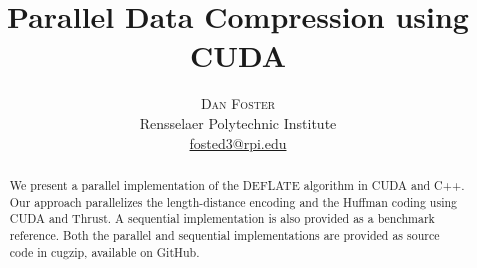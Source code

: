 \documentclass[twoside]{article}
\title{\vspace{-15mm}\fontsize{23pt}{10pt}\selectfont\textbf{Parallel Data Compression using CUDA}} %
\author{
\large
\textsc{Dan Foster}\\[2mm] %
\normalsize Rensselaer Polytechnic Institute \\ %
\normalsize \href{mailto:fosted3@rpi.edu}{fosted3@rpi.edu} %
\vspace{-5mm}
}
\date{}
\begin{document}
\maketitle %



\begin{abstract}

\noindent We present a parallel implementation of the DEFLATE algorithm in CUDA and C++. Our approach parallelizes the length-distance encoding and the Huffman coding using CUDA and Thrust. A sequential implementation is also provided as a benchmark reference. Both the parallel and sequential implementations are provided as source code in cugzip, available on GitHub.

\end{abstract}

\end{document}
